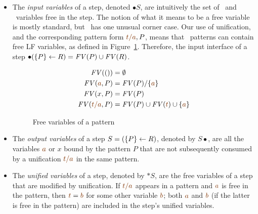\smallskip
\begin{itemize}
\item The {\it input variables} of a step, denoted ${\bullet}S$, are
  intuitively the set of \lf~and \sls~variables free in the step. The
  notion of what it means to be a free variable is mostly standard,
  but \sls~has one unusual corner case. Our use of unification, and
  the corresponding pattern form $\lf{t/a}, P$, means that
  \sls~patterns can contain free LF variables, as defined in
  Figure~\ref{fig:freevarspat}.  Therefore, the input interface of a
  step ${\bullet}(\{{P}\} \leftarrow {R}) =  {\it FV}(P) \cup
  {\it FV}(R)$.

\begin{figure}
\begin{align*}
{\it FV}(()) & = \emptyset
\\
{\it FV}(\lf{a}, P) & = {\it FV}(P)/\{\lf{a}\} 
\\
{\it FV}(x, P) & = {\it FV}(P)
\\
{\it FV}(\lf{t/a}, P) & =  {\it FV}(P) \cup {\it FV}(\lf{t}) \cup \{ \lf{a} \}
\end{align*}
\caption{Free variables of a pattern}
\label{fig:freevarspat}
\end{figure}


\item The {\it output variables} of a step $S = (\{{P}\} \leftarrow {R})$,
  denoted by $S{\bullet}$, are all the variables $\lf{a}$ or $x$ bound
  by the pattern $P$ that are not subsequently consumed by a
  unification $\lf{t/a}$ in the same pattern.

\item The {\it unified variables} of a step, denoted by ${\ast}S$, are
  the free variables of a step that are modified by unification. If
  $\lf{t/a}$ appears in a pattern and $\lf{a}$ is free in the pattern,
  then $\lf{t} = \lf{b}$ for some other variable $\lf{b}$; both
  $\lf{a}$ and $\lf{b}$ (if the latter is free in the pattern) are
  included in the step's unified variables.
\end{itemize}
\smallskip

